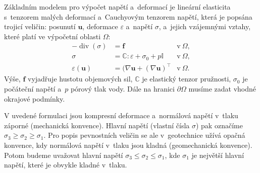 \documentclass{article}
\def\eps{\varepsilon}
\def\T{\intercal}
\def\div{\operatorname{div}}
\def\vc#1{\mathbf{\boldsymbol{#1}}}     %
\def\tn#1{{\mathbb{#1}}}    %
\begin{document}
Základním modelem pro výpočet napětí a~deformací je lineární elasticita s~tenzorem malých deformací a~Cauchyovým tenzorem napětí, která je popsána trojicí veličin: posunutí $\vc u$, deformace $\eps$ a~napětí $\sigma$, a~jejich vzájemnými vztahy, které platí ve výpočetní oblasti $\Omega$:
\begin{align*}
	- \div(\sigma) &= \vc f &\mbox{v} \ \Omega, \\
	\sigma &= \tn C : \eps + \sigma_0 + p\tn I  &\mbox{v} \ \Omega, \\
	\eps(\vc u) &= (\nabla \vc u + (\nabla \vc u)^\T &\mbox{v} \ \Omega.
\end{align*}
Výše, $\vc f$ vyjadřuje hustotu objemových sil, $\tn C$ je elastický tenzor pružnosti, $\sigma_0$ je počáteční napětí a~$p$ pórový tlak vody. 
Dále na hranici $\partial \Omega$ musíme zadat vhodné okrajové podmínky.

V uvedené formulaci jsou kompresní deformace a~normálová napětí v~tlaku záporné (mechanická konvence). 
Hlavní napětí (vlastní čísla $\sigma$) pak označíme $\sigma_3 \geq \sigma_2 \geq \sigma_1$.
Pro popis pevnostních veličin se ale v~geotechnice užívá opačná konvence, kdy normálová napětí v~tlaku jsou kladná (geomechanická konvence).
Potom budeme uvažovat hlavní napětí $\sigma_3 \leq \sigma_2 \leq \sigma_1$, kde $\sigma_1$ je největší hlavní napětí, které je obvykle kladné v~tlaku.
\end{document}
